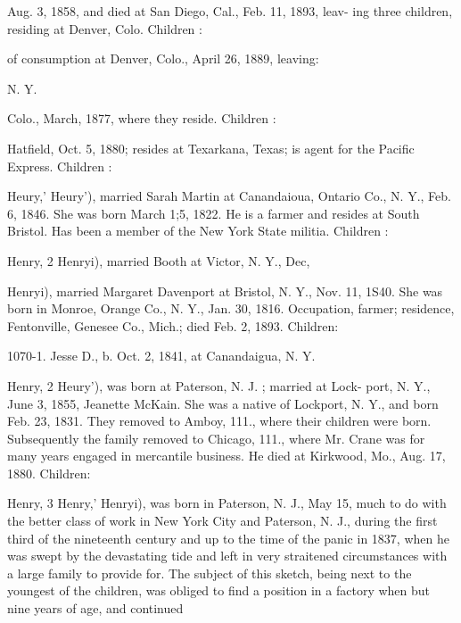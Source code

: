 \documentclass{book}
\begin{document}
Aug. 3, 1858, and died at San Diego, Cal., Feb. 11, 1893, leav- 
ing three children, residing at Denver, Colo. Children : 





of consumption at Denver, Colo., April 26, 1889, leaving: 


N. Y. 



Colo., March, 1877, where they reside. Children : 






Hatfield, Oct. 5, 1880; resides at Texarkana, Texas; is agent 
for the Pacific Express. Children : 




Heury,' Heury'), married Sarah Martin at Canandaioua, Ontario 
Co., N. Y., Feb. 6, 1846. She was born March 1;5, 1822. He 
is a farmer and resides at South Bristol. Has been a member of 
the New York State militia. Children : 



Henry, 2 Henryi), married Booth at Victor, N. Y., Dec, 



Henryi), married Margaret Davenport at Bristol, N. Y., Nov. 
11, 1S40. She was born in Monroe, Orange Co., N. Y., Jan. 
30, 1816. Occupation, farmer; residence, Fentonville, Genesee 
Co., Mich.; died Feb. 2, 1893. Children: 

1070-1. Jesse D., b. Oct. 2, 1841, at Canandaigua, N. Y. 

Henry, 2 Heury'), was born at Paterson, N. J. ; married at Lock- 
port, N. Y., June 3, 1855, Jeanette McKain. She was a native 
of Lockport, N. Y., and born Feb. 23, 1831. They removed 
to Amboy, 111., where their children were born. Subsequently the 
family removed to Chicago, 111., where Mr. Crane was for many 
years engaged in mercantile business. He died at Kirkwood, 
Mo., Aug. 17, 1880. Children: 


Henry, 3 Henry,' Henryi), was born in Paterson, N. J., May 15, 
much to do with the better class of work in New York City and 
Paterson, N. J., during the first third of the nineteenth century 
and up to the time of the panic in 1837, when he was swept by 
the devastating tide and left in very straitened circumstances 
with a large family to provide for. The subject of this sketch, 
being next to the youngest of the children, was obliged to find a 
position in a factory when but nine years of age, and continued 
\end{document}

